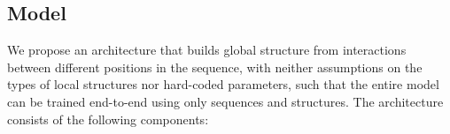 \documentclass{article}
\begin{document}
%
%







\subsection{Model}


We propose an architecture that builds global structure from interactions between different positions in the sequence,
with neither assumptions on the types of local structures nor hard-coded parameters,
such that the entire model can be trained end-to-end using only sequences and structures.
The architecture consists of the following components:






%

\end{document}
